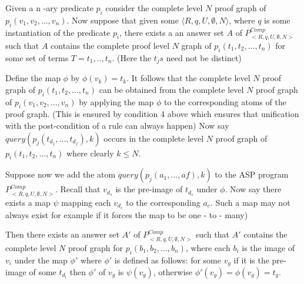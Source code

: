 \documentclass[sigconf]{acmart}
\begin{document}
Given a n -ary predicate $p_{i}$ consider the complete level $N$ proof graph of $p_{i}(v_{1},v_{2},...,v_{n})$. Now suppose that given some $\langle R,q,U,\emptyset,N\rangle$, where $q$ is some instantiation of the predicate $p_{i}$, there exists a an answer set $A$ of $P_{<R,q,U,\emptyset,N>}^{Comp}$ such that $A$ contains the complete proof level $N$ graph of $p_{i}(t_{1},t_{2},...,t_{n})$ for some set of terms  $T = t_{1},..,t_{n}$. (Here the $t_{j}s$ need not be distinct)

Define the map $\phi$ by $\phi(v_{k})= t_{k}$. It follows that the complete level $N$ proof graph  of $p_{i}(t_{1},t_{2},...,t_{n})$ can be obtained from the complete level $N$ proof graph of $p_{i}(v_{1},v_{2},...,v_{n})$ by applying the map $\phi$ to the corresponding atoms of the proof graph. (This is ensured by condition 4 above which ensures that unification with the post-condition of a rule can always happen) Now say $query(p_{j}(t_{d_{1}},...,t_{d_{f}}),k)$ occurs in the complete level $N$ proof graph of $p_{i}(t_{1},t_{2},...,t_{n})$ where clearly $k\leq N$.

Suppose now we add the atom $query(p_{j}(a_{1},...,a{f}),k)$ to the ASP program $P_{<R,q,U,\emptyset,N>}^{Comp}$. Recall that $v_{d_{s}}$ is the pre-image of $t_{d_{s}}$ under $\phi$. Now say there exists a map $\psi$ mapping each $v_{d_{c}}$ to the corresponding $a_{c}$. Such a map may not always exist for example if it forces the map to be one - to - many)

Then there exists an answer set $A'$ of $P_{<R,q,U,\emptyset,N>}^{Comp}$ such that $A'$ contains the complete level $N$ proof graph for $p_{i}(b_{1},b_{2},...,b_{n})$, where each $b_{i}$ is the image of $v_{i}$ under the map $\phi'$ where $\phi'$ is defined as follows: for some $v_{g}$ if it is the pre-image of some $t_{d_{l}}$ then $\phi'$ of $v_{g}$ is $\psi(v_{g})$, otherwise $\phi'(v_{g}) = \phi(v_{g})= t_{g}$.
\end{document}
